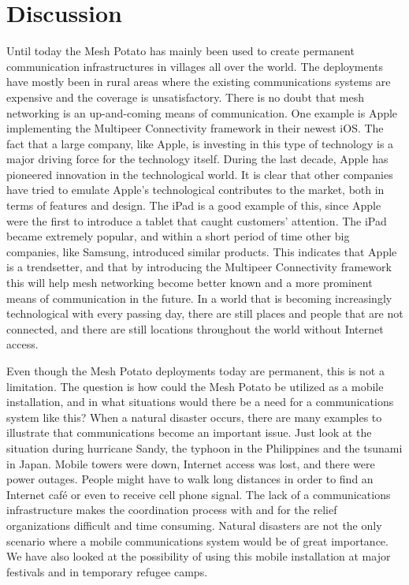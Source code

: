 \chapter{Discussion}
\label{chp:discussion} 

Until today the Mesh Potato has mainly been used to create permanent communication infrastructures in villages all over the world. The deployments have mostly been in rural areas where the existing communications systems are expensive and the coverage is unsatisfactory. There is no doubt that mesh networking is an up-and-coming means of communication. One example is Apple implementing the Multipeer Connectivity framework in their newest iOS. The fact that a large company, like Apple, is investing in this type of technology is a major driving force for the technology itself. During the last decade, Apple has pioneered innovation in the technological world. It is clear that other companies have tried to emulate Apple's technological contributes to the market, both in terms of features and design. The iPad is a good example of this, since Apple were the first to introduce a tablet that caught customers' attention. The iPad became extremely popular, and within a short period of time other big companies, like Samsung, introduced similar products. This indicates that Apple is a trendsetter, and that by introducing the Multipeer Connectivity framework this will help mesh networking become better known and a more prominent means of communication in the future. In a world that is becoming increasingly technological with every passing day, there are still places and people that are not connected, and there are still locations throughout the world without Internet access. 

Even though the Mesh Potato deployments today are permanent, this is not a limitation. The question is how could the Mesh Potato be utilized as a mobile installation, and in what situations would there be a need for a communications system like this? When a natural disaster occurs, there are many examples to illustrate that communications become an important issue. Just look at the situation during hurricane Sandy, the typhoon in the Philippines and the tsunami in Japan. Mobile towers were down, Internet access was lost, and there were power outages. People might have to walk long distances in order to find an Internet café or even to receive cell phone signal. The lack of a communications infrastructure makes the coordination process with and for the relief organizations difficult and time consuming. Natural disasters are not the only scenario where a mobile communications system would be of great importance. We have also looked at the possibility of using this mobile installation at major festivals and in temporary refugee camps. 

